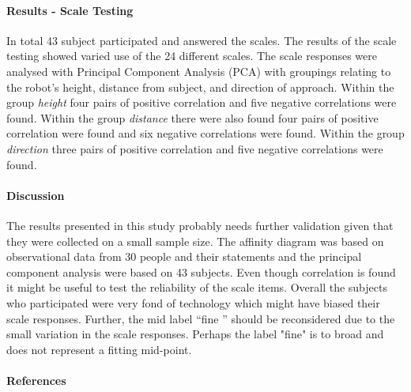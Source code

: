 \documentclass[a4paper]{article}
\begin{document}
\paragraph{Results - Scale Testing}
In total 43 subject participated and answered the scales. The results of the scale testing showed varied use of the 24 different scales. The scale responses were analysed with Principal Component Analysis (PCA) with groupings relating to the robot's height, distance from subject, and direction of approach. Within the group \textit{height} four pairs of positive correlation and five negative correlations were found. Within the group \textit{distance} there were also found four pairs of positive correlation were found and six negative correlations were found. Within the group \textit{direction} three pairs of positive correlation and five negative correlations were found. 

\paragraph{Discussion}
The results presented in this study probably needs further validation given that they were collected on a small sample size. The affinity diagram was based on observational data from 30 people and their statements and the principal component analysis  were based on 43 subjects. Even though correlation is found it might be useful to test the reliability of the scale items. Overall the subjects who participated were very fond of technology which might have biased their scale responses. Further, the mid label ``fine '' should be reconsidered due to the small variation in the scale responses. Perhaps the label "fine" is to broad and does not represent a fitting mid-point. 

\paragraph{References}
\end{document}
